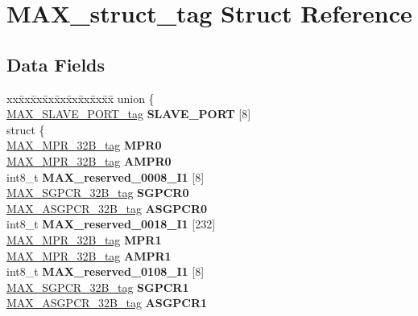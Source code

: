 \hypertarget{structMAX__struct__tag}{}\section{M\+A\+X\+\_\+struct\+\_\+tag Struct Reference}
\label{structMAX__struct__tag}
\subsection*{Data Fields}
\begin{DoxyCompactItemize}
\item 
\mbox{\label{structMAX__struct__tag_a08d451431e341acdd711b7662d268e67}} 
\begin{tabbing}
xx\=xx\=xx\=xx\=xx\=xx\=xx\=xx\=xx\=\kill
union \{\\
\>\mbox{\hyperlink{structMAX__SLAVE__PORT__struct__tag}{MAX\_SLAVE\_PORT\_tag}} {\bfseries SLAVE\_PORT} \mbox{[}8\mbox{]}\\
\mbox{\label{unionMAX__struct__tag_1_1_0D2141_a7d29ac9db16e762be020894aad84b480}} 
\>struct \{\\
\>\>\mbox{\hyperlink{unionMAX__MPR__32B__tag}{MAX\_MPR\_32B\_tag}} {\bfseries MPR0}\\
\>\>\mbox{\hyperlink{unionMAX__MPR__32B__tag}{MAX\_MPR\_32B\_tag}} {\bfseries AMPR0}\\
\>\>int8\_t {\bfseries MAX\_reserved\_0008\_I1} \mbox{[}8\mbox{]}\\
\>\>\mbox{\hyperlink{unionMAX__SGPCR__32B__tag}{MAX\_SGPCR\_32B\_tag}} {\bfseries SGPCR0}\\
\>\>\mbox{\hyperlink{unionMAX__ASGPCR__32B__tag}{MAX\_ASGPCR\_32B\_tag}} {\bfseries ASGPCR0}\\
\>\>int8\_t {\bfseries MAX\_reserved\_0018\_I1} \mbox{[}232\mbox{]}\\
\>\>\mbox{\hyperlink{unionMAX__MPR__32B__tag}{MAX\_MPR\_32B\_tag}} {\bfseries MPR1}\\
\>\>\mbox{\hyperlink{unionMAX__MPR__32B__tag}{MAX\_MPR\_32B\_tag}} {\bfseries AMPR1}\\
\>\>int8\_t {\bfseries MAX\_reserved\_0108\_I1} \mbox{[}8\mbox{]}\\
\>\>\mbox{\hyperlink{unionMAX__SGPCR__32B__tag}{MAX\_SGPCR\_32B\_tag}} {\bfseries SGPCR1}\\
\>\>\mbox{\hyperlink{unionMAX__ASGPCR__32B__tag}{MAX\_ASGPCR\_32B\_tag}} {\bfseries ASGPCR1}\\

\end{tabbing}
\end{DoxyCompactItemize}
